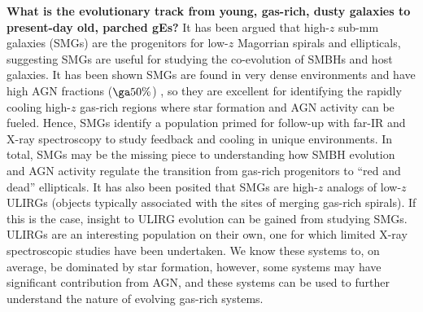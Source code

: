 \documentclass[12pt]{article}
\begin{document}
{\bf{What is the evolutionary track from young, gas-rich, dusty
    galaxies to present-day old, parched gEs?}} It has been argued
that high-$z$ sub-mm galaxies (SMGs) are the progenitors for low-$z$
Magorrian spirals and ellipticals, suggesting SMGs are useful for
studying the co-evolution of SMBHs and host galaxies. It has been
shown SMGs are found in very dense environments and have high AGN
fractions ($\ga 50\%$) \cite{2005ApJ...632..736A}, so they are
excellent for identifying the rapidly cooling high-$z$ gas-rich
regions where star formation and AGN activity can be fueled. Hence,
SMGs identify a population primed for follow-up with far-IR and X-ray
spectroscopy to study feedback and cooling in unique environments. In
total, SMGs may be the missing piece to understanding how SMBH
evolution and AGN activity regulate the transition from gas-rich
progenitors to ``red and dead'' ellipticals. It has also been posited
that SMGs are high-$z$ analogs of low-$z$ ULIRGs (objects typically
associated with the sites of merging gas-rich spirals). If this is the
case, insight to ULIRG evolution can be gained from studying
SMGs. ULIRGs are an interesting population on their own, one for which
limited X-ray spectroscopic studies have been undertaken. We know
these systems to, on average, be dominated by star formation, however,
some systems may have significant contribution from AGN, and these
systems can be used to further understand the nature of evolving
gas-rich systems.
\end{document}
